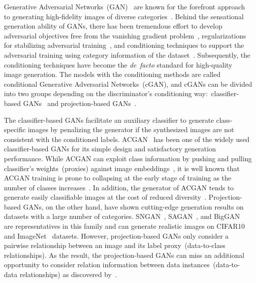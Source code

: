 \documentclass{article}
\begin{document}
Generative Adversarial Networks~(GAN)~\cite{Goodfellow2014GenerativeAN} are known for the forefront approach to generating high-fidelity images of diverse categories~\cite{Radford2016UnsupervisedRL, Miyato2018SpectralNF, Brock2019LargeSG, karras2019style, Wu2019LOGANLO, karras2020analyzing, Karras2020TrainingGA, zhao2020differentiable}. Behind the sensational generation ability of GANs, there has been tremendous effort to develop adversarial objectives free from the vanishing gradient problem~\cite{Mao2017LeastSG, Arjovsky2017WassersteinG, Arjovsky2017TowardsPM}, regularizations for stabilizing adversarial training~\cite{Arjovsky2017WassersteinG, Gulrajani2017ImprovedTO, Kodali2018OnCA, Miyato2018SpectralNF, zhou2019lipschitz, Zhang2019ConsistencyRF, Zhao2020ImprovedCR}, and conditioning techniques to support the adversarial training using category information of the dataset~\cite{Odena2017ConditionalIS, Miyato2018cGANsWP, NIPS2019_8414, Siarohin2019WhiteningAC, Liu_2019_ICCV, kang2020contragan, shim2020circlegan, zhou2020omni, kavalerov2021multi, hou2021cgans, Han_2021_ICCV}. Subsequently, the conditioning techniques have become the \emph{de~facto} standard for high-quality image generation. The models with the conditioning methods are called conditional Generative Adversarial Networks~(cGAN), and cGANs can be divided into two groups depending on the discriminator's conditioning way:~classifier-based GANs~\cite{Odena2017ConditionalIS, NIPS2019_8414, kang2020contragan, zhou2020omni, hou2021cgans} and projection-based GANs~\cite{Miyato2018cGANsWP, Miyato2018SpectralNF, Brock2019LargeSG, Han_2021_ICCV}. 

The classifier-based GANs facilitate an auxiliary classifier to generate class-specific images by penalizing the generator if the synthesized images are not consistent with the conditioned labels. ACGAN~\cite{Odena2017ConditionalIS} 
has been one of the widely used classifier-based GANs for its simple design and satisfactory generation performance. While ACGAN can exploit class information by pushing and pulling classifier's weights~(proxies) against image embeddings~\cite{kang2020contragan}, it is well known that ACGAN training is prone to collapsing at the early stage of training as the number of classes increases~\cite{Miyato2018cGANsWP, kang2020contragan, zhou2020omni, hou2021cgans}. In addition, the generator of ACGAN tends to generate easily classifiable images at the cost of reduced diversity~\cite{Odena2017ConditionalIS, Miyato2018cGANsWP, hou2021cgans}.
Projection-based GANs, on the other hand, have shown cutting-edge generation results on datasets with a large number of categories. SNGAN~\cite{Miyato2018SpectralNF}, SAGAN~\cite{Zhang2019SelfAttentionGA}, and BigGAN~\cite{Brock2019LargeSG} are representatives in this family and can generate realistic images on CIFAR10~\cite{Krizhevsky2009LearningML} and ImageNet~\cite{Deng2009ImageNetAL} datasets. However, projection-based GANs only consider a pairwise relationship between an image and its label proxy~(data-to-class relationships). As the result, the projection-based GANs can miss an additional opportunity to consider relation information between data instances~(data-to-data relationships) as discovered by~\cite{kang2020contragan}.
\end{document}
